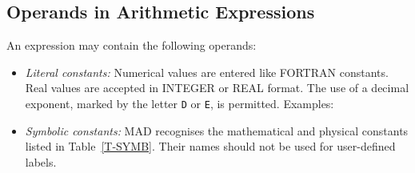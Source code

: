 \subsection{Operands in Arithmetic Expressions}
An expression may contain the following operands:
\begin{itemize}
\item {\em Literal constants:}
Numerical values are entered like FORTRAN constants.
Real values are accepted in INTEGER or REAL format.
The use of a decimal exponent, marked by the letter {\tt D} or {\tt E},
is permitted.
Examples:
\item {\em Symbolic constants:}
MAD recognises the mathematical and physical constants
listed in Table~\ref{T-SYMB}.
Their names should not be used for user-defined labels.
 

\end{itemize}

